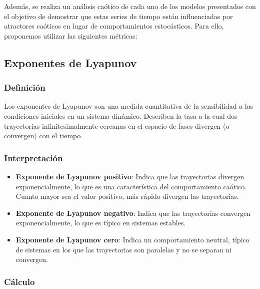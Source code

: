 \documentclass[11pt]{article}
\providecommand{\tightlist}{%
      \setlength{\itemsep}{0pt}\setlength{\parskip}{0pt}}
\begin{document}
    Además, se realiza un análisis caótico de cada uno de los modelos
presentados con el objetivo de demostrar que estas series de tiempo
están influenciadas por atractores caóticos en lugar de comportamientos
estocásticos. Para ello, proponemos utilizar las siguientes métricas:

\hypertarget{exponentes-de-lyapunov}{%
\subsection{Exponentes de Lyapunov}\label{exponentes-de-lyapunov}}

\hypertarget{definiciuxf3n}{%
\subsubsection{Definición}\label{definiciuxf3n}}

Los exponentes de Lyapunov son una medida cuantitativa de la
sensibilidad a las condiciones iniciales en un sistema dinámico.
Describen la tasa a la cual dos trayectorias infinitesimalmente cercanas
en el espacio de fases divergen (o convergen) con el tiempo.

\hypertarget{interpretaciuxf3n}{%
\subsubsection{Interpretación}\label{interpretaciuxf3n}}

\begin{itemize}
\tightlist
\item
  \textbf{Exponente de Lyapunov positivo}: Indica que las trayectorias
  divergen exponencialmente, lo que es una característica del
  comportamiento caótico. Cuanto mayor sea el valor positivo, más rápido
  divergen las trayectorias.
\item
  \textbf{Exponente de Lyapunov negativo}: Indica que las trayectorias
  convergen exponencialmente, lo que es típico en sistemas estables.
\item
  \textbf{Exponente de Lyapunov cero}: Indica un comportamiento neutral,
  típico de sistemas en los que las trayectorias son paralelas y no se
  separan ni convergen.
\end{itemize}

\hypertarget{cuxe1lculo}{%
\subsubsection{Cálculo}\label{cuxe1lculo}}
\end{document}
